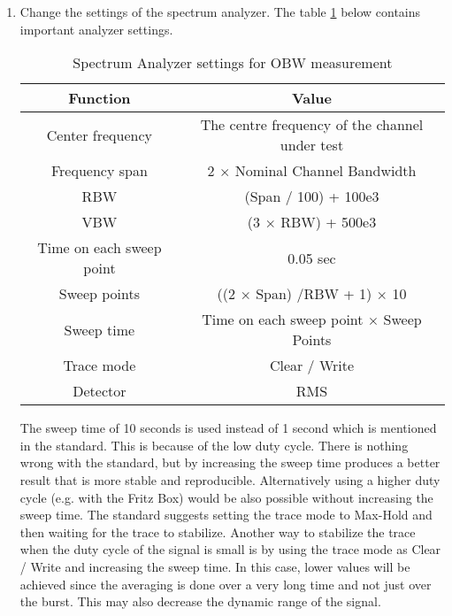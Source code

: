 \begin{enumerate}
\item Change the settings of the spectrum analyzer. The table \ref{tab:analyzer} below contains important analyzer settings.
\begin{table}[H]
\begin{center}
\begin {tabular} {|c|c|} 
\toprule
Function & Value \\ 
\midrule 
Center frequency & The centre frequency of the channel under test \\
Frequency span &2 $\times$ Nominal Channel Bandwidth \\
\ac{RBW} & (Span / 100) + 100e3 \\
\ac{VBW} & (3 $\times$ RBW) + 500e3\\
Time on each sweep point & 0.05 sec\\
Sweep points & ((2 $\times$ Span) /RBW + 1) $\times$ 10\\
Sweep time & Time on each sweep point $\times$ Sweep Points \\
Trace mode & Clear / Write\\
Detector & \ac{RMS}\\
\bottomrule
\end{tabular} 
\caption{Spectrum Analyzer settings for \ac{OBW} measurement}
\label{tab:analyzer}
\end{center}
\end{table}
The sweep time of 10 seconds is used instead of 1 second which is mentioned in the standard. This is because of the low duty cycle. There is nothing wrong with the standard, but by increasing the sweep time produces a better result that is more stable and reproducible. Alternatively using a higher duty cycle (e.g. with the Fritz Box) would be also possible without increasing the sweep time. The standard suggests setting the trace mode to Max-Hold and then waiting for the trace to stabilize. Another way to stabilize the trace when the duty cycle of the signal is small is by using the trace mode as Clear / Write and increasing the sweep time. In this case, lower values will be achieved since the averaging is done over a very long time and not just over the burst. This may also decrease the dynamic range of the signal.


\end{enumerate}
